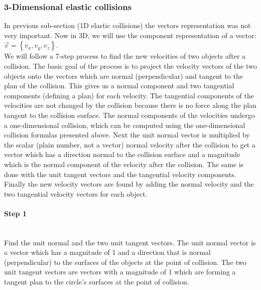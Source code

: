 \subsubsection{3-Dimensional elastic collisions}
In previous sub-section (1D elastic collisions) the vectors representation was not very important.
Now in 3D, we will use the component representation of a vector: $\vec{v} = \left\{ v_x, v_y, v_z \right\}$.\\

We will follow a 7-step process to find the new velocities of two objects after a collision. 
The basic goal of the process is to project the velocity vectors of the two objects onto the vectors which are normal (perpendicular) and tangent to the plan of the collision. 
This gives us a normal component and two tangential components (defining a plan) for each velocity. 
The tangential components of the velocities are not changed by the collision because there is no force along the plan tangent to the collision surface. 
The normal components of the velocities undergo a one-dimensional collision, which can be computed using the one-dimensional collision formulas presented above.
Next the unit normal vector is multiplied by the scalar (plain number, not a vector) normal velocity after the collision to get a vector which has a direction normal to the collision surface and a magnitude which is the normal component of the velocity after the collision. 
The same is done with the unit tangent vectors and the tangential velocity components. 
Finally the new velocity vectors are found by adding the normal velocity and the two tangential velocity vectors for each object.

\paragraph{Step 1}
~\\
Find the unit normal and the two unit tangent vectors.
The unit normal vector is a vector which has a magnitude of 1 and a direction that is normal (perpendicular) to the surfaces of the objects at the point of collision. 
The two unit tangent vectors are vectors with a magnitude of 1 which are forming a tangent plan to the circle's surfaces at the point of collision.
	
